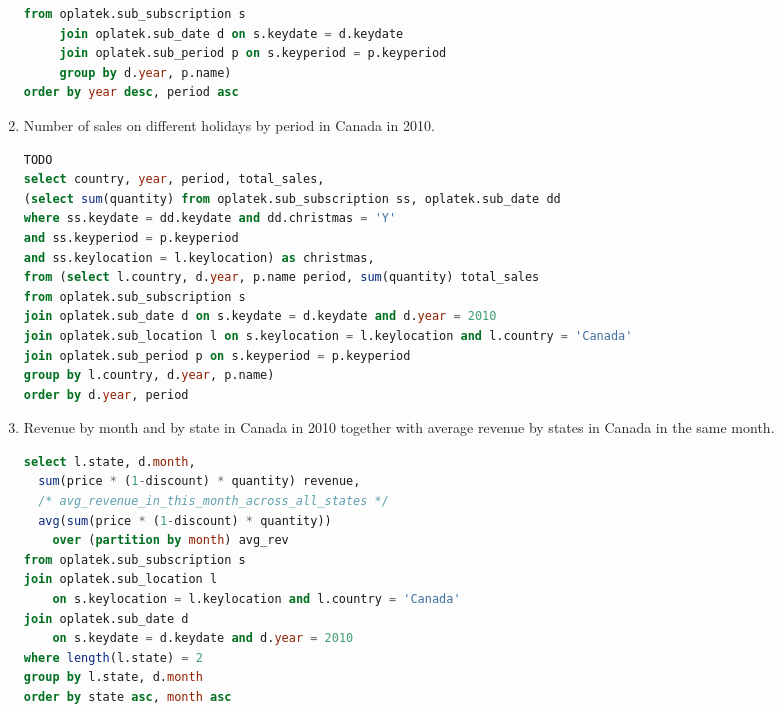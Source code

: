 \begin{enumerate}
\begin{lstlisting}[language=sql]
     from oplatek.sub_subscription s 
     join oplatek.sub_date d on s.keydate = d.keydate
     join oplatek.sub_period p on s.keyperiod = p.keyperiod
     group by d.year, p.name)
order by year desc, period asc
\end{lstlisting}
  \item Number of sales on different holidays by period in Canada in 2010.
\begin{lstlisting}[language=sql] 
TODO
select country, year, period, total_sales, 
(select sum(quantity) from oplatek.sub_subscription ss, oplatek.sub_date dd 
where ss.keydate = dd.keydate and dd.christmas = 'Y' 
and ss.keyperiod = p.keyperiod 
and ss.keylocation = l.keylocation) as christmas,
from (select l.country, d.year, p.name period, sum(quantity) total_sales
from oplatek.sub_subscription s 
join oplatek.sub_date d on s.keydate = d.keydate and d.year = 2010
join oplatek.sub_location l on s.keylocation = l.keylocation and l.country = 'Canada'
join oplatek.sub_period p on s.keyperiod = p.keyperiod 
group by l.country, d.year, p.name)
order by d.year, period
\end{lstlisting}
  \item Revenue by month and by state in Canada in 2010 together with average revenue by states in Canada in the same month.
\begin{lstlisting}[language=sql] 
select l.state, d.month, 
  sum(price * (1-discount) * quantity) revenue,
  /* avg_revenue_in_this_month_across_all_states */
  avg(sum(price * (1-discount) * quantity)) 
    over (partition by month) avg_rev 
from oplatek.sub_subscription s 
join oplatek.sub_location l 
    on s.keylocation = l.keylocation and l.country = 'Canada' 
join oplatek.sub_date d 
    on s.keydate = d.keydate and d.year = 2010
where length(l.state) = 2
group by l.state, d.month
order by state asc, month asc
\end{lstlisting}
\end{enumerate}

